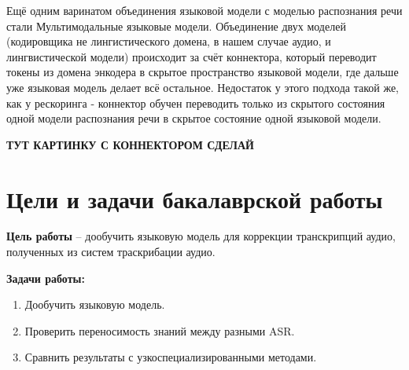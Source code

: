 Ещё одним варинатом объединения языковой модели с моделью распознания речи стали Мультимодальные языковые модели.
Объединение двух моделей (кодировщика не лингистического домена, в нашем случае аудио, и лингвистической модели) происходит за счёт коннектора, который переводит токены из домена энкодера в скрытое пространство языковой модели, где дальше уже языковая модель делает всё остальное.
Недостаток у этого подхода такой же, как у рескоринга - коннектор обучен переводить только из скрытого состояния одной модели распознания речи в скрытое состояние одной языковой модели.

\textbf{ТУТ КАРТИНКУ С КОННЕКТОРОМ СДЕЛАЙ}

\section{Цели и задачи бакалаврской работы}

\textbf{Цель работы} -- дообучить языковую модель для коррекции транскрипций аудио, полученных из систем траскрибации аудио.

\textbf{Задачи работы:}
\begin{enumerate}
  \item Дообучить языковую модель.
  \item Проверить переносимость знаний между разными ASR.
  \item Сравнить результаты с узкоспециализированными методами.
\end{enumerate}
